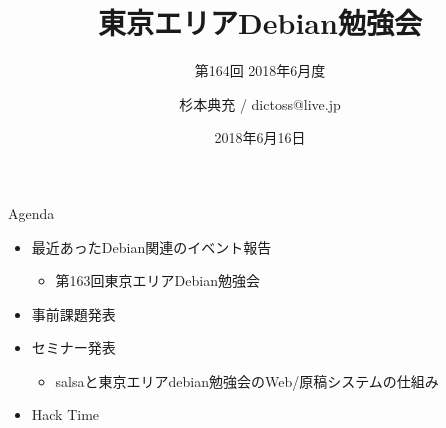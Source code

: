 \title{東京エリアDebian勉強会}
\subtitle{第164回 2018年6月度}
\author{杉本典充 / dictoss@live.jp}
\date{2018年6月16日}



\begin{frame}
\titlepage{}
\end{frame}

\begin{frame}{Agenda}
 \begin{minipage}[t]{0.45\hsize}
  \begin{itemize}
  \item 最近あったDebian関連のイベント報告
    \begin{itemize}
    \item 第163回東京エリアDebian勉強会
    \end{itemize}
  \item 事前課題発表
  \end{itemize}
 \end{minipage}
 \begin{minipage}[t]{0.45\hsize}
  \begin{itemize}
  \item セミナー発表
    \begin{itemize}
    \item salsaと東京エリアdebian勉強会のWeb/原稿システムの仕組み
    \end{itemize}
  \item Hack Time
  \end{itemize}
 \end{minipage}
\end{frame}

